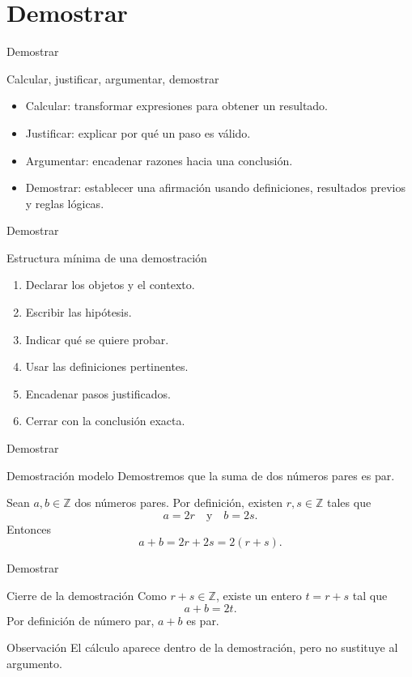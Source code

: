 \documentclass[aspectratio=169,11pt]{beamer}
\newcommand{\Z}{\mathbb{Z}}
\begin{document}
\section{Demostrar}

\begin{frame}{Demostrar}
\begin{block}{Calcular, justificar, argumentar, demostrar}
\begin{itemize}
  \item Calcular: transformar expresiones para obtener un resultado.
  \item Justificar: explicar por qué un paso es válido.
  \item Argumentar: encadenar razones hacia una conclusión.
  \item Demostrar: establecer una afirmación usando definiciones, resultados previos y reglas lógicas.
\end{itemize}
\end{block}
\end{frame}

\begin{frame}{Demostrar}
\begin{block}{Estructura mínima de una demostración}
\begin{enumerate}
  \item Declarar los objetos y el contexto.
  \item Escribir las hipótesis.
  \item Indicar qué se quiere probar.
  \item Usar las definiciones pertinentes.
  \item Encadenar pasos justificados.
  \item Cerrar con la conclusión exacta.
\end{enumerate}
\end{block}
\end{frame}

\begin{frame}{Demostrar}
\begin{block}{Demostración modelo}
Demostremos que la suma de dos números pares es par.
\end{block}

Sean \(a,b\in\Z\) dos números pares. Por definición, existen \(r,s\in\Z\) tales que
\[
  a=2r
  \quad\text{y}\quad
  b=2s.
\]
Entonces
\[
  a+b=2r+2s=2(r+s).
\]
\end{frame}

\begin{frame}{Demostrar}
\begin{block}{Cierre de la demostración}
Como \(r+s\in\Z\), existe un entero \(t=r+s\) tal que
\[
  a+b=2t.
\]
Por definición de número par, \(a+b\) es par.
\end{block}

\begin{alertblock}{Observación}
El cálculo aparece dentro de la demostración, pero no sustituye al argumento.
\end{alertblock}
\end{frame}
\end{document}
